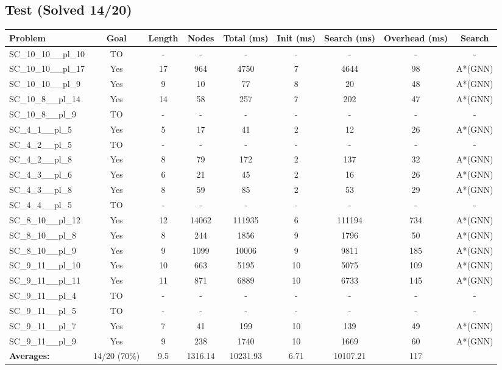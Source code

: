 \documentclass{article}
\begin{document}
\subsection*{Test (Solved 14/20)}
\begin{tabular}{lcccccccc}
\toprule
Problem & Goal & Length & Nodes & Total (ms) & Init (ms) & Search (ms) & Overhead (ms) & Search \\
\midrule
SC\_10\_10\_\_pl\_10 & TO & - & - & - & - & - & - & - \\
SC\_10\_10\_\_pl\_17 & Yes & 17 & 964 & 4750 & 7 & 4644 & 98 & A*(GNN) \\
SC\_10\_10\_\_pl\_9 & Yes & 9 & 10 & 77 & 8 & 20 & 48 & A*(GNN) \\
SC\_10\_8\_\_pl\_14 & Yes & 14 & 58 & 257 & 7 & 202 & 47 & A*(GNN) \\
SC\_10\_8\_\_pl\_9 & TO & - & - & - & - & - & - & - \\
SC\_4\_1\_\_pl\_5 & Yes & 5 & 17 & 41 & 2 & 12 & 26 & A*(GNN) \\
SC\_4\_2\_\_pl\_5 & TO & - & - & - & - & - & - & - \\
SC\_4\_2\_\_pl\_8 & Yes & 8 & 79 & 172 & 2 & 137 & 32 & A*(GNN) \\
SC\_4\_3\_\_pl\_6 & Yes & 6 & 21 & 45 & 2 & 16 & 26 & A*(GNN) \\
SC\_4\_3\_\_pl\_8 & Yes & 8 & 59 & 85 & 2 & 53 & 29 & A*(GNN) \\
SC\_4\_4\_\_pl\_5 & TO & - & - & - & - & - & - & - \\
SC\_8\_10\_\_pl\_12 & Yes & 12 & 14062 & 111935 & 6 & 111194 & 734 & A*(GNN) \\
SC\_8\_10\_\_pl\_8 & Yes & 8 & 244 & 1856 & 9 & 1796 & 50 & A*(GNN) \\
SC\_8\_10\_\_pl\_9 & Yes & 9 & 1099 & 10006 & 9 & 9811 & 185 & A*(GNN) \\
SC\_9\_11\_\_pl\_10 & Yes & 10 & 663 & 5195 & 10 & 5075 & 109 & A*(GNN) \\
SC\_9\_11\_\_pl\_11 & Yes & 11 & 871 & 6889 & 10 & 6733 & 145 & A*(GNN) \\
SC\_9\_11\_\_pl\_4 & TO & - & - & - & - & - & - & - \\
SC\_9\_11\_\_pl\_5 & TO & - & - & - & - & - & - & - \\
SC\_9\_11\_\_pl\_7 & Yes & 7 & 41 & 199 & 10 & 139 & 49 & A*(GNN) \\
SC\_9\_11\_\_pl\_9 & Yes & 9 & 238 & 1740 & 10 & 1669 & 60 & A*(GNN) \\
\textbf{Averages:} & 14/20 (70\%) & 9.5 & 1316.14 & 10231.93 & 6.71 & 10107.21 & 117 & \\
\bottomrule
\end{tabular}
\\[0.7cm]
\end{document}
